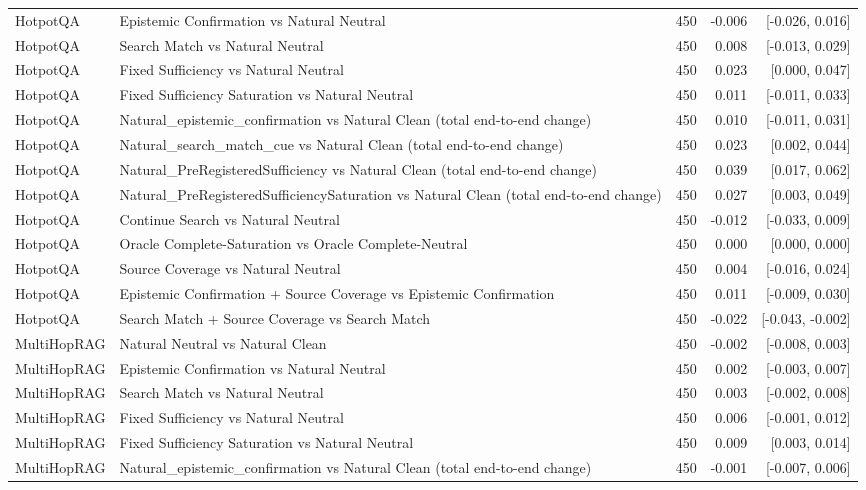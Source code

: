 \begin{table}[t]
\begin{tabular}{llrrr}
HotpotQA & Epistemic Confirmation vs Natural Neutral & 450 & -0.006 & [-0.026, 0.016] \\
HotpotQA & Search Match vs Natural Neutral & 450 & 0.008 & [-0.013, 0.029] \\
HotpotQA & Fixed Sufficiency vs Natural Neutral & 450 & 0.023 & [0.000, 0.047] \\
HotpotQA & Fixed Sufficiency Saturation vs Natural Neutral & 450 & 0.011 & [-0.011, 0.033] \\
HotpotQA & Natural\_epistemic\_confirmation vs Natural Clean (total end-to-end change) & 450 & 0.010 & [-0.011, 0.031] \\
HotpotQA & Natural\_search\_match\_cue vs Natural Clean (total end-to-end change) & 450 & 0.023 & [0.002, 0.044] \\
HotpotQA & Natural\_PreRegisteredSufficiency vs Natural Clean (total end-to-end change) & 450 & 0.039 & [0.017, 0.062] \\
HotpotQA & Natural\_PreRegisteredSufficiencySaturation vs Natural Clean (total end-to-end change) & 450 & 0.027 & [0.003, 0.049] \\
HotpotQA & Continue Search vs Natural Neutral & 450 & -0.012 & [-0.033, 0.009] \\
HotpotQA & Oracle Complete-Saturation vs Oracle Complete-Neutral & 450 & 0.000 & [0.000, 0.000] \\
HotpotQA & Source Coverage vs Natural Neutral & 450 & 0.004 & [-0.016, 0.024] \\
HotpotQA & Epistemic Confirmation + Source Coverage vs Epistemic Confirmation & 450 & 0.011 & [-0.009, 0.030] \\
HotpotQA & Search Match + Source Coverage vs Search Match & 450 & -0.022 & [-0.043, -0.002] \\
MultiHopRAG & Natural Neutral vs Natural Clean & 450 & -0.002 & [-0.008, 0.003] \\
MultiHopRAG & Epistemic Confirmation vs Natural Neutral & 450 & 0.002 & [-0.003, 0.007] \\
MultiHopRAG & Search Match vs Natural Neutral & 450 & 0.003 & [-0.002, 0.008] \\
MultiHopRAG & Fixed Sufficiency vs Natural Neutral & 450 & 0.006 & [-0.001, 0.012] \\
MultiHopRAG & Fixed Sufficiency Saturation vs Natural Neutral & 450 & 0.009 & [0.003, 0.014] \\
MultiHopRAG & Natural\_epistemic\_confirmation vs Natural Clean (total end-to-end change) & 450 & -0.001 & [-0.007, 0.006] \\

\end{tabular}
\end{table}
